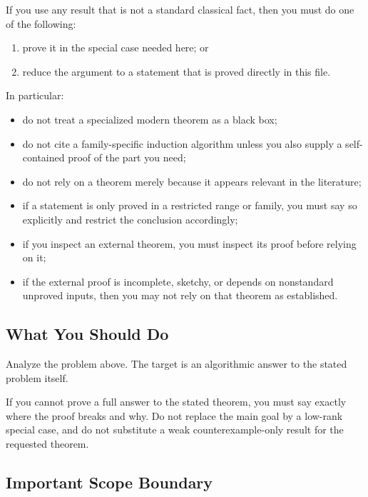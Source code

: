 \documentclass[
]{article}
\providecommand{\tightlist}{%
  \setlength{\itemsep}{0pt}\setlength{\parskip}{0pt}}
\begin{document}
If you use any result that is not a standard classical fact, then you
must do one of the following:

\begin{enumerate}
\def\labelenumi{\arabic{enumi}.}
\tightlist
\item
  prove it in the special case needed here; or
\item
  reduce the argument to a statement that is proved directly in this
  file.
\end{enumerate}

In particular:

\begin{itemize}
\tightlist
\item
  do not treat a specialized modern theorem as a black box;
\item
  do not cite a family-specific induction algorithm unless you also
  supply a self-contained proof of the part you need;
\item
  do not rely on a theorem merely because it appears relevant in the
  literature;
\item
  if a statement is only proved in a restricted range or family, you
  must say so explicitly and restrict the conclusion accordingly;
\item
  if you inspect an external theorem, you must inspect its proof before
  relying on it;
\item
  if the external proof is incomplete, sketchy, or depends on
  nonstandard unproved inputs, then you may not rely on that theorem as
  established.
\end{itemize}

\subsection{What You Should Do}\label{what-you-should-do}

Analyze the problem above. The target is an algorithmic answer to the
stated problem itself.

If you cannot prove a full answer to the stated theorem, you must say
exactly where the proof breaks and why. Do not replace the main goal by
a low-rank special case, and do not substitute a weak
counterexample-only result for the requested theorem.

\subsection{Important Scope Boundary}\label{important-scope-boundary}
\end{document}

